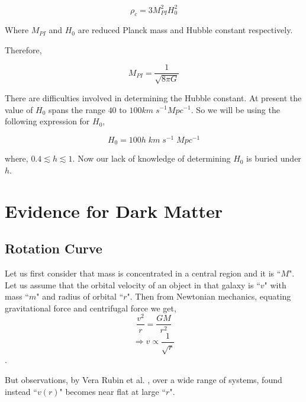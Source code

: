 \documentclass[12pt]{report}
\begin{document}
\begin{equation}
\rho_c =  3 M^2_{PI} H^2_0
\end{equation}

Where $M_{PI}$ and $H_0$ are reduced Planck mass and Hubble constant respectively.

Therefore,

$$M_{PI}= \frac{1}{\sqrt{8 \pi G}}$$

There are difficulties involved in determining the Hubble constant. At present the value of $H_0$ spans the range $40$ to $100 km\;s^{-1} Mpc^{-1}$. So we will be using the following expression for $H_0$,

\begin{equation}
H_0= 100h \; km\; s^{-1}\; Mpc^{-1}
\end{equation}

where, $0.4 \lesssim h \lesssim 1$. Now our lack of knowledge of determining $H_0$ is buried under $h$.\\

\newpage




\section{Evidence for Dark Matter}



\subsection{Rotation Curve}


Let us first consider that mass is concentrated in a central region and it is ``$M$". Let us assume that the orbital velocity of an object in that galaxy is ``$v$" with mass ``$m$" and radius of orbital ``$r$". Then from Newtonian mechanics, equating gravitational force and centrifugal force we get, $$\frac{v^2}{r}=\frac{GM}{r^2}$$ $$\Rightarrow v\propto \frac{1}{\sqrt{r}}$$.

But observations, by Vera Rubin et al.\cite{rcurve} , over a wide range of systems, found instead ``$v(r)$" becomes near flat at large ``$r$".\\
\end{document}
